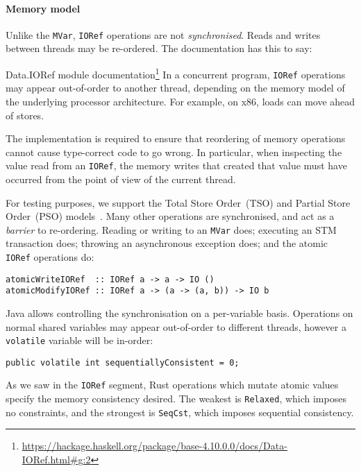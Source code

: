 \paragraph{Memory model}
Unlike the \verb|MVar|, \verb|IORef| operations are not
\emph{synchronised}.  Reads and writes between threads may be
re-ordered.  The documentation has this to say:

\begin{bquote}{Data.IORef module documentation\footnote{\url{https://hackage.haskell.org/package/base-4.10.0.0/docs/Data-IORef.html\#g:2}}}
  In a concurrent program, \verb|IORef| operations may appear out-of-order to
  another thread, depending on the memory model of the underlying processor
  architecture.  For example, on x86, loads can move ahead of stores.

  The implementation is required to ensure that reordering of memory operations
  cannot cause type-correct code to go wrong.  In particular, when inspecting
  the value read from an \verb|IORef|, the memory writes that created that value
  must have occurred from the point of view of the current thread.
\end{bquote}

For testing purposes, we support the Total Store Order~(TSO) and Partial Store
Order~(PSO) models~.  Many other operations are
synchronised, and act as a \emph{barrier} to re-ordering.  Reading or writing to
an \verb|MVar| does; executing an STM transaction does; throwing an asynchronous
exception does; and the atomic \verb|IORef| operations do:

\begin{verbatim}
atomicWriteIORef  :: IORef a -> a -> IO ()
atomicModifyIORef :: IORef a -> (a -> (a, b)) -> IO b
\end{verbatim}

Java allows controlling the synchronisation on a per-variable basis.
Operations on normal shared variables may appear out-of-order to
different threads, however a \verb|volatile| variable will be
in-order:

\begin{verbatim}
public volatile int sequentiallyConsistent = 0;
\end{verbatim}

As we saw in the \verb|IORef| segment, Rust operations which mutate
atomic values specify the memory consistency desired.  The weakest is
\verb|Relaxed|, which imposes no constraints, and the strongest is
\verb|SeqCst|, which imposes sequential consistency.

